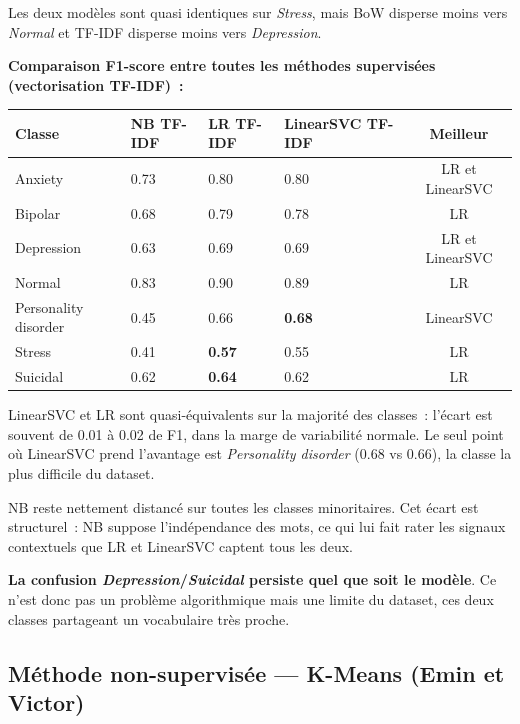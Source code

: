 \documentclass[12pt,a4paper]{report}
\renewcommand{\arraystretch}{1}
\begin{document}
Les deux modèles sont quasi identiques sur \textit{Stress}, mais BoW disperse moins vers \textit{Normal} et TF-IDF disperse moins vers \textit{Depression}.

\textbf{Comparaison F1-score entre toutes les méthodes supervisées (vectorisation TF-IDF)~:}

\begin{center}
\renewcommand{\arraystretch}{1.2}
\begin{tabular}{@{}lC{2cm}C{2cm}C{2cm}c@{}}
\toprule
\textbf{Classe} & \textbf{NB TF-IDF} & \textbf{LR TF-IDF} & \textbf{LinearSVC TF-IDF} & \textbf{Meilleur} \\
\midrule
Anxiety              & 0.73 & 0.80 & 0.80 & LR et LinearSVC \\
Bipolar              & 0.68 & 0.79 & 0.78 & LR \\
Depression           & 0.63 & 0.69 & 0.69 & LR et LinearSVC \\
Normal               & 0.83 & 0.90 & 0.89 & LR \\
Personality disorder & 0.45 & 0.66 & \textbf{0.68} & LinearSVC \\
Stress               & 0.41 & \textbf{0.57} & 0.55 & LR \\
Suicidal             & 0.62 & \textbf{0.64} & 0.62 & LR \\
\bottomrule
\end{tabular}
\end{center}

LinearSVC et LR sont quasi-équivalents sur la majorité des classes~: l'écart est souvent de 0.01 à 0.02 de F1, dans la marge de variabilité normale. Le seul point où LinearSVC prend l'avantage est \textit{Personality disorder} (0.68 vs 0.66), la classe la plus difficile du dataset.

NB reste nettement distancé sur toutes les classes minoritaires. Cet écart est structurel~: NB suppose l'indépendance des mots, ce qui lui fait rater les signaux contextuels que LR et LinearSVC captent tous les deux.

\textbf{La confusion \textit{Depression}/\textit{Suicidal} persiste quel que soit le modèle}. Ce n'est donc pas un problème algorithmique mais une limite du dataset, ces deux classes partageant un vocabulaire très proche.

\pagebreak
\subsection{Méthode non-supervisée --- K-Means (Emin et Victor)}
\end{document}
